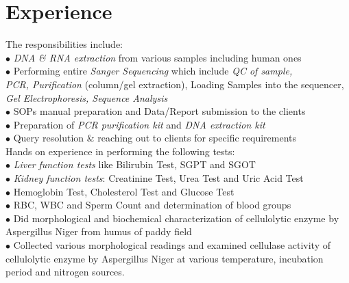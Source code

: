 \documentclass[letterpaper]{twentysecondcv} %
\begin{document}

\section{Experience}

\begin{twenty} %
	{The responsibilities include:\\
	$\bullet$ \emph{ DNA \& RNA extraction} from various samples including human ones\\
	$\bullet$ Performing entire \emph{ Sanger Sequencing} which include \emph{QC of sample,\\ \phantom{i}  PCR, Purification} (column/gel extraction), Loading Samples into \phantom{ix}the sequencer,\emph{ Gel Electrophoresis, Sequence Analysis}\\
	$\bullet$ SOPs manual preparation and Data/Report submission to the clients\\
	$\bullet$ Preparation of\emph{ PCR purification kit} and \emph{ DNA extraction kit}\\
	$\bullet$ Query resolution \& reaching out to clients for specific requirements\\
	}
	{Hands on experience in performing the following tests:\\
	$\bullet$ \emph{Liver function tests} like Bilirubin Test, SGPT and SGOT\\
	$\bullet$\emph{ Kidney function tests}: Creatinine Test, Urea Test and Uric Acid Test\\
	$\bullet$ Hemoglobin Test, Cholesterol Test and  Glucose  Test\\
	$\bullet$ RBC, WBC and Sperm Count and determination of blood groups\\
	}
	{$\bullet$ Did morphological and biochemical characterization of cellulolytic \phantom{ix}enzyme by Aspergillus Niger from humus of paddy field\\
	$\bullet$ Collected various morphological readings and examined cellulase  \phantom{ix}activity of cellulolytic enzyme by Aspergillus Niger at various \phantom{ix}temperature, incubation period and nitrogen sources.\\\\
	}

\end{twenty}
\end{document}
